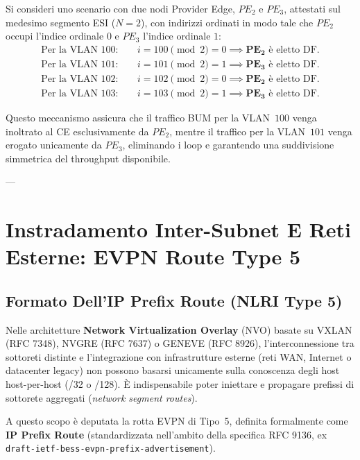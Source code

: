 \documentclass[11pt, a4paper]{article}
\begin{document}
Si consideri uno scenario con due nodi Provider Edge, $PE_2$ e $PE_3$, attestati sul medesimo segmento ESI ($N=2$), con indirizzi ordinati in modo tale che $PE_2$ occupi l'indice ordinale $0$ e $PE_3$ l'indice ordinale $1$:
\begin{align*}
    \text{Per la VLAN } 100: \quad & i = 100 \pmod 2 = 0 \implies \mathbf{PE_2} \text{ è eletto DF}. \\
    \text{Per la VLAN } 101: \quad & i = 101 \pmod 2 = 1 \implies \mathbf{PE_3} \text{ è eletto DF}. \\
    \text{Per la VLAN } 102: \quad & i = 102 \pmod 2 = 0 \implies \mathbf{PE_2} \text{ è eletto DF}. \\
    \text{Per la VLAN } 103: \quad & i = 103 \pmod 2 = 1 \implies \mathbf{PE_3} \text{ è eletto DF}.
\end{align*}

Questo meccanismo assicura che il traffico BUM per la VLAN~$100$ venga inoltrato al CE esclusivamente da $PE_2$, mentre il traffico per la VLAN~$101$ venga erogato unicamente da $PE_3$, eliminando i loop e garantendo una suddivisione simmetrica del throughput disponibile.

---

\newpage

\section{Instradamento Inter-Subnet E Reti Esterne: EVPN Route Type 5}

\subsection{Formato Dell'IP Prefix Route (NLRI Type 5)}

Nelle architetture \textbf{Network Virtualization Overlay} (NVO) basate su VXLAN (RFC 7348), NVGRE (RFC 7637) o GENEVE (RFC 8926), l'interconnessione tra sottoreti distinte e l'integrazione con infrastrutture esterne (reti WAN, Internet o datacenter legacy) non possono basarsi unicamente sulla conoscenza degli host host-per-host (/32 o /128). È indispensabile poter iniettare e propagare prefissi di sottorete aggregati (\emph{network segment routes}).

A questo scopo è deputata la rotta EVPN di Tipo~5, definita formalmente come \textbf{IP Prefix Route} (standardizzata nell'ambito della specifica RFC 9136, ex \texttt{draft-ietf-bess-evpn-prefix-advertisement}).

\end{document}
